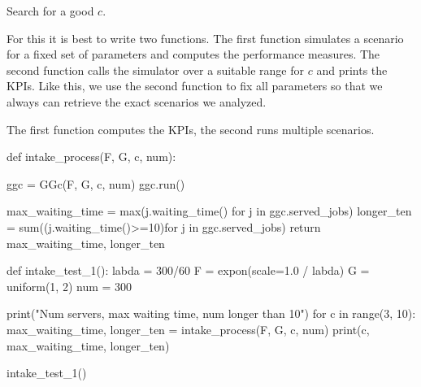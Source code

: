 \begin{exercise}
  Search for a good $c$.

   
   \begin{hint}
  For this it is best to write two functions. The first function simulates a scenario for a fixed set of parameters and computes the performance measures. The second  function calls the simulator over a suitable range for $c$ and prints the KPIs. Like this, we use  the second function to fix all parameters so that we always can retrieve the exact scenarios we analyzed. 
   \end{hint}

  \begin{solution}
The first function computes the KPIs, the second runs multiple scenarios. 

    \begin{pyblock}
def intake_process(F, G, c, num):

    ggc = GGc(F, G, c, num)
    ggc.run()

    max_waiting_time = max(j.waiting_time() for j in ggc.served_jobs)
    longer_ten = sum((j.waiting_time()>=10)for j in ggc.served_jobs)
    return max_waiting_time, longer_ten


def intake_test_1():
    labda = 300/60
    F = expon(scale=1.0 / labda)
    G = uniform(1, 2)
    num = 300

    print("Num servers, max waiting time, num longer than 10")
    for c in range(3, 10):
        max_waiting_time, longer_ten = intake_process(F, G, c, num)
        print(c, max_waiting_time, longer_ten)

      
intake_test_1()

    \end{pyblock}
  \end{solution}
  
\end{exercise}

